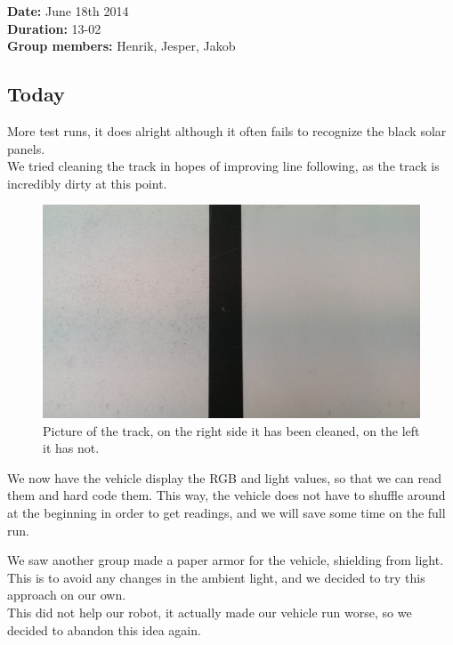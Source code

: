 \textbf{Date:} June 18th 2014\\\textbf{Duration:} 13-02\\\textbf{Group
members:} Henrik, Jesper, Jakob

\subsection{Today}

More test runs, it does alright although it often fails to recognize the
black solar panels.\\We tried cleaning the track in hopes of improving
line following, as the track is incredibly dirty at this
point.
\begin{figure}[hbt]
  \centering
  \includegraphics[scale=0.13]{../experiments/images/cleaning.jpg}
  \caption{Picture of the track, on the right side it has been cleaned, on the left it has not.}
\end{figure}
We now have the vehicle display the RGB and light values, so that we can
read them and hard code them. This way, the vehicle does not have to
shuffle around at the beginning in order to get readings, and we will save
some time on the full run.

We saw another group made a paper armor for the vehicle, shielding from
light. This is to avoid any changes in the ambient light, and we decided
to try this approach on our own.\\This did not help our robot, it actually made
our vehicle run worse, so we decided to abandon this idea again.

